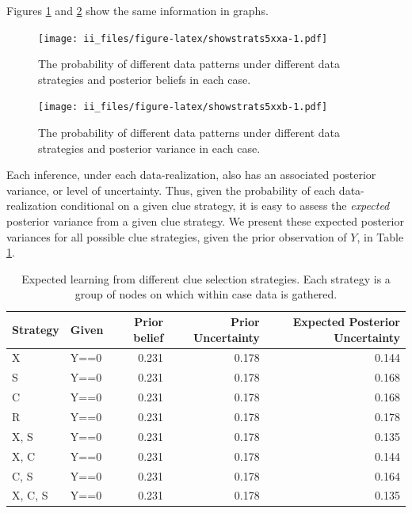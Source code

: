 \documentclass[
  12pt,
]{book}
\begin{document}
Figures \ref{fig:showstrats5xxa} and \ref{fig:showstrats5xxb} show the same information in graphs.

\begin{figure}
\centering
\texttt{[image: ii\_files/figure-latex/showstrats5xxa-1.pdf]}
\caption{\label{fig:showstrats5xxa}The probability of different data patterns under different data strategies and posterior beliefs in each case.}
\end{figure}

\begin{figure}
\centering
\texttt{[image: ii\_files/figure-latex/showstrats5xxb-1.pdf]}
\caption{\label{fig:showstrats5xxb}The probability of different data patterns under different data strategies and posterior variance in each case.}
\end{figure}

Each inference, under each data-realization, also has an associated posterior variance, or level of uncertainty. Thus, given the probability of each data-realization conditional on a given clue strategy, it is easy to assess the \emph{expected} posterior variance from a given clue strategy. We present these expected posterior variances for all possible clue strategies, given the prior observation of \(Y\), in Table \ref{tab:scxrylearning}.

\begin{table}

\caption{\label{tab:scxrylearning}Expected learning from different clue selection strategies. Each strategy is a group of nodes on which within case data is gathered. }
\centering
\begin{tabular}[t]{l|l|r|r|r}
\hline
Strategy & Given & Prior belief & Prior Uncertainty & Expected Posterior Uncertainty\\
\hline
X & Y==0 & 0.231 & 0.178 & 0.144\\
\hline
S & Y==0 & 0.231 & 0.178 & 0.168\\
\hline
C & Y==0 & 0.231 & 0.178 & 0.168\\
\hline
R & Y==0 & 0.231 & 0.178 & 0.178\\
\hline
X, S & Y==0 & 0.231 & 0.178 & 0.135\\
\hline
X, C & Y==0 & 0.231 & 0.178 & 0.144\\
\hline
C, S & Y==0 & 0.231 & 0.178 & 0.164\\
\hline
X, C, S & Y==0 & 0.231 & 0.178 & 0.135\\
\hline
\end{tabular}
\end{table}
\end{document}
